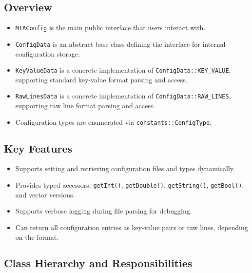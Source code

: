\subsection{Overview}

\begin{itemize}
	\item \texttt{MIAConfig} is the main public interface that users interact with.
	\item \texttt{ConfigData} is an abstract base class defining the interface for internal configuration storage.
	\item \texttt{KeyValueData} is a concrete implementation of \texttt{ConfigData::KEY\_VALUE}, supporting standard key-value format parsing and access.
	\item \texttt{RawLinesData} is a concrete implementation of \texttt{ConfigData::RAW\_LINES}, supporting raw line format parsing and access.
	\item Configuration types are enumerated via \texttt{constants::ConfigType}.
\end{itemize}

\subsection{Key Features}

\begin{itemize}
	\item Supports setting and retrieving configuration files and types dynamically.
	\item Provides typed accessors: \texttt{getInt()}, \texttt{getDouble()}, \texttt{getString()}, \texttt{getBool()}, and vector versions.
	\item Supports verbose logging during file parsing for debugging.
	\item Can return all configuration entries as key-value pairs or raw lines, depending on the format.
\end{itemize}

\subsection{Class Hierarchy and Responsibilities}

